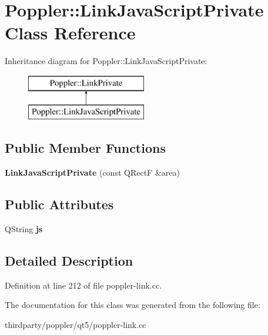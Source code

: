 \hypertarget{class_poppler_1_1_link_java_script_private}{}\section{Poppler\+:\+:Link\+Java\+Script\+Private Class Reference}
\label{class_poppler_1_1_link_java_script_private}
Inheritance diagram for Poppler\+:\+:Link\+Java\+Script\+Private\+:\begin{figure}[H]
\begin{center}
\leavevmode
\includegraphics[height=2.000000cm]{class_poppler_1_1_link_java_script_private}
\end{center}
\end{figure}
\subsection*{Public Member Functions}
\begin{DoxyCompactItemize}
\item 
\mbox{\label{class_poppler_1_1_link_java_script_private_aeeb511ff684b4d38ac63cf46327c62a3}} 
{\bfseries Link\+Java\+Script\+Private} (const Q\+RectF \&area)
\end{DoxyCompactItemize}
\subsection*{Public Attributes}
\begin{DoxyCompactItemize}
\item 
\mbox{\label{class_poppler_1_1_link_java_script_private_ae0370e1cc682bd0217673e2c1da7b543}} 
Q\+String {\bfseries js}
\end{DoxyCompactItemize}


\subsection{Detailed Description}


Definition at line 212 of file poppler-\/link.\+cc.



The documentation for this class was generated from the following file\+:\begin{DoxyCompactItemize}
\item 
thirdparty/poppler/qt5/poppler-\/link.\+cc\end{DoxyCompactItemize}
